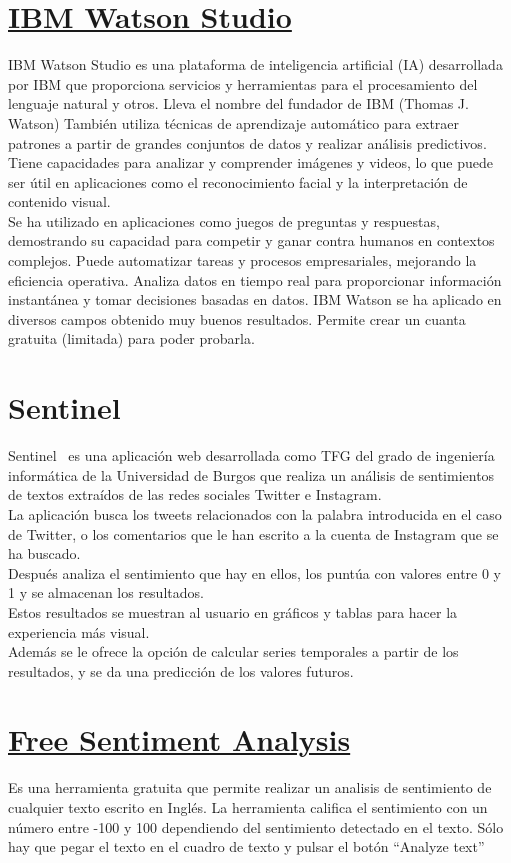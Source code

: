 \section{\href{https://www.ibm.com/products/watson-studio}{IBM Watson Studio}}
IBM Watson Studio es una plataforma de inteligencia artificial (IA) desarrollada 
por IBM que proporciona servicios y herramientas para el procesamiento 
del lenguaje natural y otros. 
Lleva el nombre del fundador de IBM (Thomas J. Watson)
También utiliza técnicas de aprendizaje automático 
para extraer patrones a partir de grandes conjuntos de datos y realizar análisis predictivos.\\
Tiene capacidades para analizar y comprender imágenes y videos, lo que puede 
ser útil en aplicaciones como el reconocimiento facial y la interpretación de contenido visual.\\
Se ha utilizado en aplicaciones como juegos de preguntas y 
respuestas, demostrando su capacidad para competir y ganar contra humanos en contextos complejos.
Puede automatizar tareas y procesos empresariales, mejorando la eficiencia operativa.
Analiza datos en tiempo real para proporcionar información instantánea y tomar decisiones basadas en datos.
IBM Watson se ha aplicado en diversos campos obtenido muy buenos resultados.
Permite crear un cuanta gratuita (limitada) para poder probarla.

\section{Sentinel}
Sentinel~\cite{Sentinel1} es una aplicación web desarrollada como TFG del grado de ingeniería 
informática de la Universidad de Burgos que realiza un análisis de sentimientos de textos 
extraídos de las redes sociales Twitter e Instagram.\\
La aplicación busca los tweets relacionados con la palabra introducida 
en el caso de Twitter, o los comentarios que le han escrito a la 
cuenta de Instagram que se ha buscado.\\
Después analiza el sentimiento que hay en ellos, los puntúa con valores entre 0 y 1 y 
se almacenan los resultados.\\
Estos resultados se muestran al usuario en gráficos 
y tablas para hacer la experiencia más visual.\\ 
Además se le ofrece la opción de calcular series temporales a partir de los resultados, 
y se da una predicción de los valores futuros.

\section{\href{https://www.danielsoper.com/sentimentanalysis/default.aspx}{Free Sentiment Analysis}}
Es una herramienta gratuita que permite realizar un analisis de sentimiento de cualquier 
texto escrito en Inglés. La herramienta califica el sentimiento con un número entre -100 y 100 
dependiendo del sentimiento detectado en el texto.
Sólo hay que pegar el texto en el cuadro de texto y pulsar el botón ``Analyze text''

